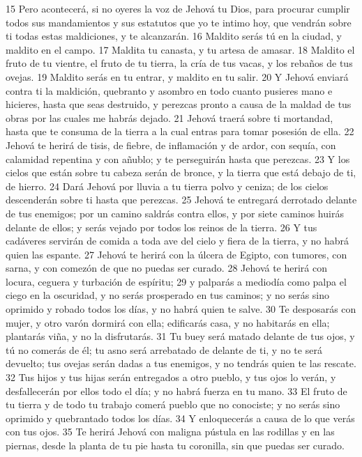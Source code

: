15 Pero acontecerá, si no oyeres la voz de Jehová tu Dios, para procurar cumplir todos sus mandamientos y sus estatutos que yo te intimo hoy, que vendrán sobre ti todas estas maldiciones, y te alcanzarán.
16 Maldito serás tú en la ciudad, y maldito en el campo.
17 Maldita tu canasta, y tu artesa de amasar.
18 Maldito el fruto de tu vientre, el fruto de tu tierra, la cría de tus vacas, y los rebaños de tus ovejas.
19 Maldito serás en tu entrar, y maldito en tu salir.
20 Y Jehová enviará contra ti la maldición, quebranto y asombro en todo cuanto pusieres mano e hicieres, hasta que seas destruido, y perezcas pronto a causa de la maldad de tus obras por las cuales me habrás dejado.
21 Jehová traerá sobre ti mortandad, hasta que te consuma de la tierra a la cual entras para tomar posesión de ella.
22 Jehová te herirá de tisis, de fiebre, de inflamación y de ardor, con sequía, con calamidad repentina y con añublo; y te perseguirán hasta que perezcas.
23 Y los cielos que están sobre tu cabeza serán de bronce, y la tierra que está debajo de ti, de hierro.
24 Dará Jehová por lluvia a tu tierra polvo y ceniza; de los cielos descenderán sobre ti hasta que perezcas.
25 Jehová te entregará derrotado delante de tus enemigos; por un camino saldrás contra ellos, y por siete caminos huirás delante de ellos; y serás vejado por todos los reinos de la tierra.
26 Y tus cadáveres servirán de comida a toda ave del cielo y fiera de la tierra, y no habrá quien las espante.
27 Jehová te herirá con la úlcera de Egipto, con tumores, con sarna, y con comezón de que no puedas ser curado.
28 Jehová te herirá con locura, ceguera y turbación de espíritu;
29 y palparás a mediodía como palpa el ciego en la oscuridad, y no serás prosperado en tus caminos; y no serás sino oprimido y robado todos los días, y no habrá quien te salve.
30 Te desposarás con mujer, y otro varón dormirá con ella; edificarás casa, y no habitarás en ella; plantarás viña, y no la disfrutarás.
31 Tu buey será matado delante de tus ojos, y tú no comerás de él; tu asno será arrebatado de delante de ti, y no te será devuelto; tus ovejas serán dadas a tus enemigos, y no tendrás quien te las rescate.
32 Tus hijos y tus hijas serán entregados a otro pueblo, y tus ojos lo verán, y desfallecerán por ellos todo el día; y no habrá fuerza en tu mano.
33 El fruto de tu tierra y de todo tu trabajo comerá pueblo que no conociste; y no serás sino oprimido y quebrantado todos los días.
34 Y enloquecerás a causa de lo que verás con tus ojos.
35 Te herirá Jehová con maligna pústula en las rodillas y en las piernas, desde la planta de tu pie hasta tu coronilla, sin que puedas ser curado.
